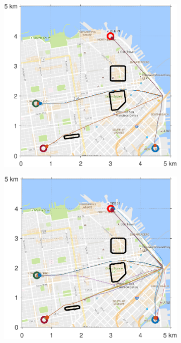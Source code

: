 \begin{figure}
  \begin{subfigure}{0.5\textwidth}
    \includegraphics[width=\columnwidth]{figs/sf_d6sep5}
    \label{fig:sf_d6sep5}
  \end{subfigure}%
  \begin{subfigure}{0.5\textwidth}
    \includegraphics[width=\columnwidth]{figs/sf_d11sep5}

\end{subfigure}
\end{figure}
